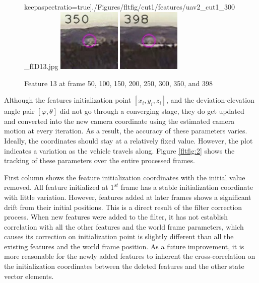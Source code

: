 \begin{figure}[h]
keepaspectratio=true]{./Figures/fltfig/cut1/features/uav2_cut1_300_fID13.jpg}
\includegraphics[width=3cm,
keepaspectratio=true]{./Figures/fltfig/cut1/features/uav2_cut1_350_fID13.jpg}
\includegraphics[width=3cm,
keepaspectratio=true]{./Figures/fltfig/cut1/features/uav2_cut1_398_fID13.jpg}
\caption{Feature 13 at frame 50, 100, 150, 200, 250, 300, 350, and 398}
\label{fltfig:1_1}
\end{figure}

Although the features initialization point $[x_i, y_i, z_i]$, and the
deviation-elevation angle pair $[\varphi, \theta]$ did not go through
a converging stage, they do get updated and converted into the new
camera coordinate using the estimated camera motion at every
iteration. As a result, the accuracy of these parameters varies.
Ideally, the coordinates should stay at a relatively fixed value.
However, the plot indicates a variation as the vehicle travels along.
Figure \ref{fltfig:2} shows the tracking of these parameters over the
entire processed frames. 

First column shows the feature initialization coordinates with the
initial value removed. All feature initialized at $1^{st}$ frame has a
stable initialization coordinate with little variation. However,
features added at later frames shows a significant drift from their
initial positions. This is a direct result of the filter correction
process. When new features were added to the filter, it has not
establish correlation with all the other features and the world frame
parameters, which causes its correction on initialization point is
slightly different than all the existing features and the world frame
position. As a future improvement, it is more reasonable for the newly
added features to inherent the cross-correlation on the initialization
coordinates between the deleted features and the other state vector
elements. 

